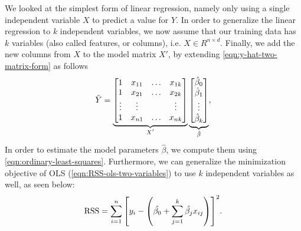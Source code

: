 We looked at the simplest form of linear regression, namely only using a single independent variable $X$ to predict a value for $Y$. In order to generalize the linear regression to $k$ independent variables, we now assume that our training data has $k$ variables (also called features, or columns), i.e. $X \in R^{n \times d}$. Finally, we add the new columns from $X$ to the model matrix $X'$, by extending \cref{eqn:y-hat-two-matrix-form} as follows
\begin{align}
    \hat{Y} =
        \undertext{
        \begin{bmatrix}
            1 & x_{11} & \ldots & x_{1k} \\
            1 & x_{21} & \ldots & x_{2k} \\
            \vdots & \vdots & & \vdots \\
            1 & x_{n1} & \ldots & x_{nk} \\
        \end{bmatrix}
        }{$X'$}
        \undertext{
        \begin{bmatrix}
            \hat{\beta}_0 \\
            \hat{\beta}_1 \\
            \vdots \\
            \hat{\beta}_k \\
        \end{bmatrix}
        }{$\hat{\beta}$},
    \label{eqn:y-hat-matrix-form-general}
\end{align}
In order to estimate the model parameters $\hat{\beta}$, we compute them using \cref{eqn:ordinary-least-squares}. Furthermore, we can generalize the minimization objective of OLS (\cref{eqn:RSS-ols-two-variables}) to use $k$ independent variables as well, as seen below:
\begin{align}
    \text{RSS} = \sum\limits_{i=1}^{n}{\left[y_i - \left(\hat{\beta_0} +  \sum\limits_{j=1}^{k}{\hat{\beta_j}x_{ij}}\right)\right]^2}.
    \label{eqn:RSS-ols-k-variables}
\end{align}

